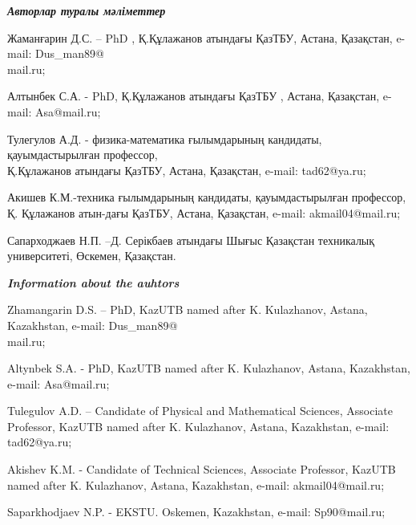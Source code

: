 \emph{{\bfseries Авторлар туралы мәліметтер}}
\begin{noparindent}

Жаманғарин Д.С. -- PhD , Қ.Құлажанов атындағы ҚазТБУ, Астана, Қазақстан,
e-mail: Dus\_man89@\\mail.ru;

Алтынбек С.А. - PhD, Қ.Құлажанов атындағы ҚазТБУ , Астана, Қазақстан,
e-mail: Asa@mail.ru;

Тулегулов А.Д. - физика-математика ғылымдарының кандидаты,
қауымдастырылған профессор,\\Қ.Құлажанов атындағы ҚазТБУ, Астана,
Қазақстан, e-mail: tad62@ya.ru;

Акишев К.М.-техника ғылымдарының кандидаты, қауымдастырылған профессор,
Қ. Құлажанов атын-дағы ҚазТБУ, Астана, Қазақстан, e-mail:
akmail04@mail.ru;

Сапарходжаев Н.П. --Д. Серікбаев атындағы Шығыс Қазақстан техникалық
университеті, Өскемен, Қазақстан.
\end{noparindent}

\emph{{\bfseries Information about the auhtors}}
\begin{noparindent}

Zhamangarin D.S. -- PhD, KazUTB named after K. Kulazhanov, Astana,
Kazakhstan, e-mail: Dus\_man89@\\mail.ru;

Altynbek S.A. - PhD, KazUTB named after K. Kulazhanov, Astana,
Kazakhstan, e-mail: Asa@mail.ru;

Tulegulov A.D. -- Candidate of Physical and Mathematical Sciences,
Associate Professor, KazUTB named after K. Kulazhanov, Astana,
Kazakhstan, e-mail: tad62@ya.ru;

Akishev K.M. - Candidate of Technical Sciences, Associate Professor,
KazUTB named after K. Kulazhanov, Astana, Kazakhstan, e-mail:
akmail04@mail.ru;

Saparkhodjaev N.P. - EKSTU. Oskemen, Kazakhstan, e-mail: Sp90@mail.ru;
\end{noparindent}


